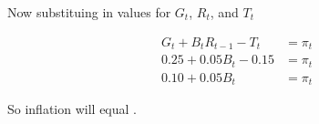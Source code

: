 \begin{homeworkProblem}[1]
    Now substituing in values for $G_t$, $R_t$, and $T_t$

    \[
        \begin{split}
            G_t + B_t R_{t-1} - T_t &= \pi_t
            \\
            0.25 + 0.05B_t - 0.15 &= \pi_t
            \\
            0.10 + 0.05B_t &= \pi_t
        \end{split}
    \]

    So inflation will equal .
    
\end{homeworkProblem}